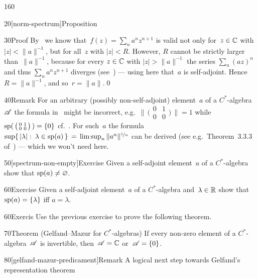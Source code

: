 \begin{parsec}{160}
\begin{point}{20}[norm-spectrum]{Proposition}
\begin{point}{30}{Proof}
By~
we know that~$f(z)=\sum_n a^nz^{n+1}$
is valid not only for~$z\in \mathbb{C}$ with $\left|z\right|< \|a\|^{-1}$,
but for all~$z$ with $\left|z\right|< R$.
However, $R$ cannot be strictly larger than~$\|a\|^{-1}$,
because for every $z\in\mathbb{C}$ with $\left|z\right|>\|a\|^{-1}$
the series $\sum_n(az)^n$ 
and thus $\sum_n a^n{z}^{n+1}$ diverges (see~)
--- using here that~$a$ is self-adjoint.
Hence~$R=\|a\|^{-1}$, and so~$r=\|a\|$.\qed
\end{point}
\end{point}
\begin{point}{40}{Remark}%
For an arbitrary (possibly non-self-adjoint)
element~$a$ of a $C^*$-algebra~$\mathscr{A}$
the formula in~
might be incorrect, e.g.~$\bigl\|\,\bigl(\begin{smallmatrix}
0& 1\\
0 & 0
\end{smallmatrix}\bigr)\,\|=1$
while 
$\mathrm{sp}(\,\bigl(\begin{smallmatrix}
0& 1\\
0 & 0
\end{smallmatrix}\bigr)\,)=\{0\}$
cf.~.
For such~$a$
the formula
$\sup\{\,\left|\lambda\right|\colon\, \lambda\in \mathrm{sp}(a)\,\}
\,=\, \limsup_n \|a^n\|^{\nicefrac{1}{n}}$
	can be derived (see e.g.~Theorem~3.3.3 of~\cite{kr}) --- 
	which we won't need here.
\end{point}
\begin{point}{50}[spectrum-non-empty]{Exercise}%
Given a self-adjoint element~$a$ of a $C^*$-algebra show that
$\mathrm{sp}(a)\neq \varnothing$.
\end{point}
\begin{point}{60}{Exercise}%
Given a self-adjoint element~$a$ of a $C^*$-algebra
and~$\lambda\in\mathbb{R}$
show that $\mathrm{sp}(a) =\{\lambda\}$ iff $a=\lambda$.
\end{point}
\begin{point}{60}{Exercis}%
Use the previous exercise to prove the following theorem.
\end{point}
\begin{point}{70}{Theorem (Gelfand--Mazur for $C^*$-algebras)}%
%
If every non-zero element of a $C^*$-algebra~$\mathscr{A}$
is invertible, then~$\mathscr{A}=\mathbb{C}$ or~$\mathscr{A}=\{0\}$.
\end{point}
\begin{point}{80}[gelfand-mazur-predicament]{Remark}%
A logical next step
towards Gelfand's representation theorem

\end{point}
\end{parsec}
